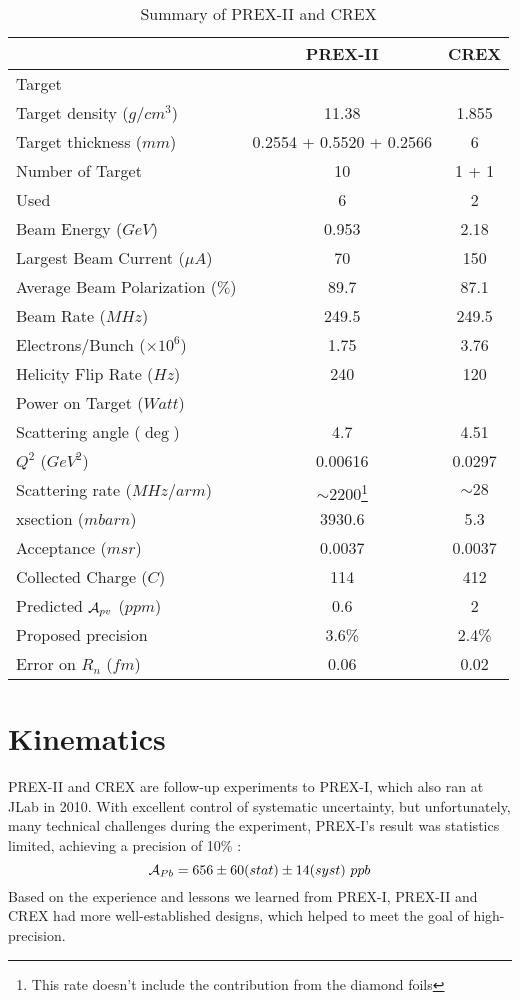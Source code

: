 \begin{table}[h]
    \centering
    \begin{tabular}{l | c c }
	\hline
	&   PREX-II & CREX  \\
	\hline
	Target	& \Pb	& \Ca	\\
	Target density ($g/cm^3$)   & 11.38 & 1.855	\\
	Target thickness ($mm$)	& 0.2554 + 0.5520 + 0.2566	& 6	\\
	Number of Target & 10 & 1 + 1	\\
	Used	& 6 & 2	\\
	\hline
	Beam Energy ($GeV$) & 0.953 & 2.18  \\
	Largest Beam Current ($\mu A$)	& 70	& 150	\\
	Average Beam Polarization ($\%$) & 89.7   & 87.1   \\
	Beam Rate ($MHz$) & 249.5	& 249.5 \\
	Electrons/Bunch	($\times 10^6$)	& 1.75	& 3.76	\\
	Helicity Flip Rate ($Hz$)  & 240   & 120   \\
	Power on Target ($Watt$)	&   &	\\
	\hline
	Scattering angle ($\deg$)   & 4.7	& 4.51 \\
	$Q^2$ ($GeV^2$)	& 0.00616   & 0.0297	\\
	Scattering rate ($MHz/arm$)   & $\sim 2200$\footnote{This rate doesn't include the contribution from the diamond foils}   & $\sim28$ \\
	xsection ($mbarn$)    & 3930.6	& 5.3   \\
	Acceptance ($msr$)    &	0.0037 & 0.0037  \\
	\hline
	Collected Charge ($C$)	& 114	& 412	\\
	\hline
	Predicted $\mathcal{A}_{pv}$ ($ppm$)	& 0.6   & 2 \\
	Proposed precision  & 3.6\%   & 2.4\% \\
	Error on $R_n$ ($fm$)	& 0.06	& 0.02	\\
	\hline
    \end{tabular}
    \caption{Summary of PREX-II and CREX}
    \label{tb:parameters}
\end{table}

\section{Kinematics}
PREX-II and CREX are follow-up experiments to PREX-I, which also ran at JLab in 2010. 
With excellent control of systematic uncertainty, but unfortunately, 
many technical challenges during the experiment, PREX-I's result was statistics 
limited, achieving a precision of 10\% \cite{PhysRevLett.108.112502}:
$$ \CA_{Pb} = 656 \pm 60 (stat) \pm 14 (syst) \ ppb$$
Based on the experience and lessons we learned from PREX-I, 
PREX-II and CREX had more well-established designs, which helped to
meet the goal of high-precision.

